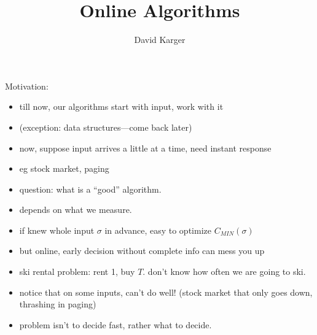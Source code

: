 \documentclass{article}
\title{Online Algorithms}
\author{David Karger}
\begin{document}
\def\OPT{\mbox{OPT}}

Motivation:
\begin{itemize}
\item till now, our algorithms start with input, work with it
\item (exception: data structures---come back later)
\item now, suppose input arrives a little at a time, need instant
  response
\item eg stock market, paging
\item question: what is a ``good'' algorithm.
\item depends on what we measure.
\item if knew whole input $\sigma $ in advance, easy to optimize
  $C_{MIN}(\sigma)$
\item but online, early decision without complete info can mess you up 
\item ski rental problem: rent 1, buy $T$.  don't know how often we are going to ski.
\item notice that on some inputs, can't do well! (stock market that
  only goes down, thrashing in paging)
\item problem isn't to decide fast, rather what to decide.
\end{itemize}
\end{document}
